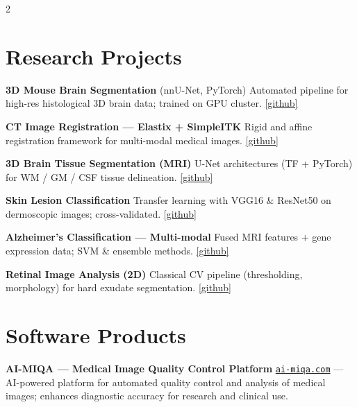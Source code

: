 \documentclass[10pt, a4paper]{article}
\begin{document}
\begin{paracol}{2}
\section{Research Projects}

\textbf{3D Mouse Brain Segmentation} (nnU-Net, PyTorch)\newline
Automated pipeline for high-res histological 3D brain data; trained on GPU cluster. \href{https://github.com/taiaburbd}{\small[github]}

\vspace{3pt}
\textbf{CT Image Registration — Elastix + SimpleITK}\newline
Rigid and affine registration framework for multi-modal medical images. \href{https://github.com/taiaburbd}{\small[github]}

\vspace{3pt}
\textbf{3D Brain Tissue Segmentation (MRI)}\newline
U-Net architectures (TF + PyTorch) for WM / GM / CSF tissue delineation. \href{https://github.com/taiaburbd}{\small[github]}

\vspace{3pt}
\textbf{Skin Lesion Classification}\newline
Transfer learning with VGG16 \& ResNet50 on dermoscopic images; cross-validated. \href{https://github.com/taiaburbd}{\small[github]}

\vspace{3pt}
\textbf{Alzheimer's Classification — Multi-modal}\newline
Fused MRI features + gene expression data; SVM \& ensemble methods. \href{https://github.com/taiaburbd}{\small[github]}

\vspace{3pt}
\textbf{Retinal Image Analysis (2D)}\newline
Classical CV pipeline (thresholding, morphology) for hard exudate segmentation. \href{https://github.com/taiaburbd}{\small[github]}

\section{Software Products}

\textbf{AI-MIQA — Medical Image Quality Control Platform}\newline
\href{https://ai-miqa.com}{\texttt{ai-miqa.com}} — AI-powered platform for automated quality control and analysis
of medical images; enhances diagnostic accuracy for research and clinical use.


\end{paracol}
\end{document}
